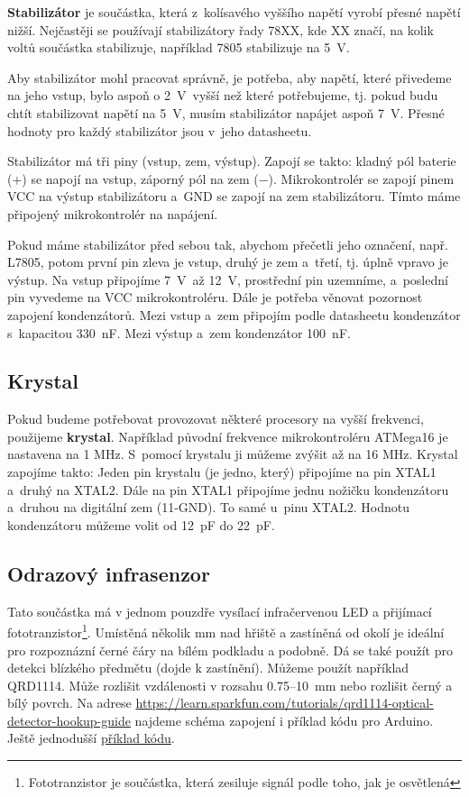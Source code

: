 {\bf Stabilizátor} je součástka, která z~kolísavého vyššího napětí vyrobí přesné napětí nižší. %
Nejčastěji se používají stabilizátory řady 78XX, kde XX značí, na kolik voltů součástka stabilizuje, například 7805 stabilizuje na 5~V. 

Aby stabilizátor mohl pracovat správně, je potřeba, aby napětí, které přivedeme na jeho vstup,
 bylo aspoň o 2~V~vyšší než které potřebujeme, tj. pokud budu chtít stabilizovat napětí na 5~V, 
 musím stabilizátor napájet aspoň 7~V. Přesné hodnoty pro každý stabilizátor jsou v~jeho datasheetu. 

Stabilizátor má tři piny (vstup, zem, výstup). Zapojí se takto: kladný pól baterie (+) se napojí na vstup, záporný pól na zem ($-$). 
Mikrokontrolér se zapojí pinem VCC na výstup stabilizátoru a~GND  se zapojí na zem stabilizátoru. 
Tímto máme připojený mikrokontrolér na napájení.


Pokud máme stabilizátor před sebou tak, abychom přečetli jeho označení, např. L7805, 
potom první pin zleva je vstup, druhý je zem a~třetí, tj. úplně vpravo je výstup. 
Na vstup připojíme 7~V~až 12~V, prostřední pin uzemníme, a~poslední pin vyvedeme na VCC mikrokontroléru. 
Dále je potřeba věnovat pozornost zapojení kondenzátorů. 
Mezi vstup a~zem připojím podle datasheetu kondenzátor s~kapacitou 330~nF. Mezi výstup a~zem kondenzátor 100~nF. 


\subsection{Krystal}
Pokud budeme potřebovat provozovat některé procesory na vyšší frekvenci, použijeme {\bf krystal}. 
Například původní frekvence mikrokontroléru ATMega16 je nastavena na 1 MHz. S~pomocí krystalu ji můžeme zvýšit až na 16 MHz. 
Krystal zapojíme takto: Jeden pin krystalu (je jedno, který) připojíme na pin XTAL1 a~druhý na XTAL2. 
Dále na pin XTAL1 připojíme jednu nožičku kondenzátoru a~druhou na digitální zem (11-GND). 
To samé u~pinu XTAL2. Hodnotu kondenzátoru můžeme volit od 12~pF do 22~pF.

\subsection{Odrazový infrasenzor}

 \label{qrd1114} Tato součástka má v jednom pouzdře vysílací infračervenou LED a přijímací fototranzistor\footnote{Fototranzistor je součástka, která zesiluje signál podle toho, jak je osvětlená}. Umístěná několik mm nad hřiště a zastíněná od okolí je ideální pro rozpoznázní  černé čáry na bílém podkladu a podobně. Dá se také použít pro detekci blízkého předmětu (dojde k zastínění).
Můžeme použít například QRD1114. Může rozlišit vzdálenosti v rozsahu 0.75--10~mm nebo rozlišit černý a bílý povrch.  
Na adrese
\url{https://learn.sparkfun.com/tutorials/qrd1114-optical-detector-hookup-guide} najdeme schéma zapojení i příklad kódu pro Arduino. Ještě jednodušší \hyperref[prog:qrd1114]{příklad kódu}.



